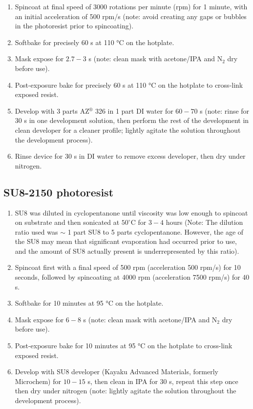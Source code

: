 \documentclass[
  a4paper,
]{scrbook}
\begin{document}
\begin{enumerate}
\def\labelenumi{\arabic{enumi}.}
\item
  Spincoat at final speed of 3000 rotations per minute (rpm) for 1
  minute, with an initial acceleration of 500 rpm/s (note: avoid
  creating any gaps or bubbles in the photoresist prior to spincoating).
\item
  Softbake for precisely 60 s at 110 °C on the hotplate.
\item
  Mask expose for \(2.7-3\) s (note: clean mask with acetone/IPA and
  N\(_2\) dry before use).
\item
  Post-exposure bake for precisely 60 s at 110 °C on the hotplate to
  cross-link exposed resist.
\item
  Develop with 3 parts AZ\(^\circledR\) 326 in 1 part DI water for
  \(60-70\) s (note: rinse for 30 s in one development solution, then
  perform the rest of the development in clean developer for a cleaner
  profile; lightly agitate the solution throughout the development
  process).
\item
  Rinse device for 30 s in DI water to remove excess developer, then dry
  under nitrogen.
\end{enumerate}

\hypertarget{su8-2150-photoresist}{%
\subsection{SU8-2150 photoresist}\label{su8-2150-photoresist}}

\begin{enumerate}
\def\labelenumi{\arabic{enumi}.}
\item
  SU8 was diluted in cyclopentanone until viscosity was low enough to
  spincoat on substrate and then sonicated at \(50^\circ\)C for \(3-4\)
  hours (Note: The dilution ratio used was \(\sim\) 1 part SU8 to 5
  parts cyclopentanone. However, the age of the SU8 may mean that
  significant evaporation had occurred prior to use, and the amount of
  SU8 actually present is underrepresented by this ratio).
\item
  Spincoat first with a final speed of 500 rpm (acceleration 500 rpm/s)
  for 10 seconds, followed by spincoating at 4000 rpm (acceleration 7500
  rpm/s) for 40 s.
\item
  Softbake for 10 minutes at 95 °C on the hotplate.
\item
  Mask expose for \(6-8\) s (note: clean mask with acetone/IPA and
  N\(_2\) dry before use).
\item
  Post-exposure bake for 10 minutes at 95 °C on the hotplate to
  cross-link exposed resist.
\item
  Develop with SU8 developer (Kayaku Advanced Materials, formerly
  Microchem) for \(10-15\) s, then clean in IPA for 30 s, repeat this
  step once then dry under nitrogen (note: lightly agitate the solution
  throughout the development process).
\end{enumerate}
\end{document}
